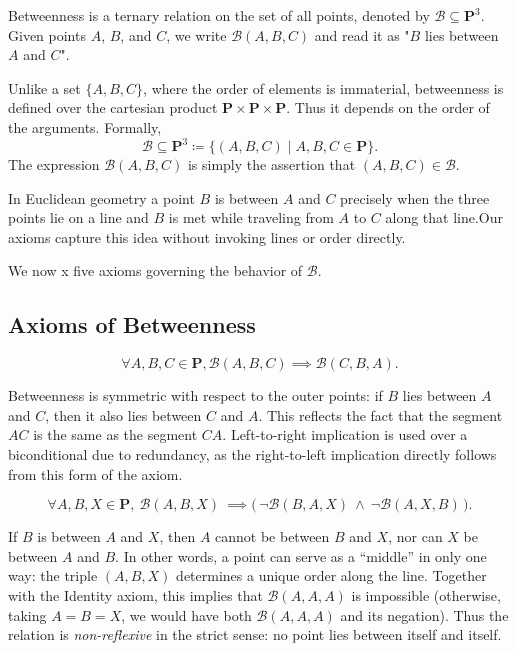 \documentclass[../../../main/main.tex]{subfiles}
\begin{document}
Betweenness is a ternary relation on the set of all points, denoted by $\mathcal{B} \subseteq \mathbf{P}^3$. Given points $A$, $B$, and $C$, we write $\mathcal{B}(A,B,C)$ and read it as "$B$ lies between $A$ and $C$".

Unlike a set $\{A, B, C\}$, where the order of elements is immaterial, betweenness is defined over the cartesian product $\mathbf{P} \times \mathbf{P} \times \mathbf{P}$. Thus it depends on the order of the arguments. Formally,
\[
\mathcal{B} \subseteq \mathbf{P}^3 \coloneqq \{(A, B, C) \mid A, B, C \in \mathbf{P}\}.
\]
The expression $\mathcal{B}(A, B, C)$ is simply the assertion that $(A, B, C) \in \mathcal{B}$.

In Euclidean geometry a point $B$ is between $A$ and $C$ precisely when the three points lie on a line and $B$ is met while traveling from $A$ to $C$ along that line.Our axioms capture this idea without invoking lines or order directly.

We now x five axioms governing the behavior of $\mathcal{B}$.

\subsection{Axioms of Betweenness}

\begin{axiom}\label{ax-symmetry-of-betweenness}
    \[
    \forall A, B, C \in \mathbf{P}, \mathcal{B}(A, B, C) \implies \mathcal{B}(C, B, A).
    \]
\end{axiom}
Betweenness is symmetric with respect to the outer points: if $B$ lies between $A$ and $C$, then it also lies between $C$ and $A$.  This reflects the fact that the segment $AC$ is the same as the segment $CA$. Left-to-right implication is used over a biconditional due to redundancy, as the right-to-left implication directly follows from this form of the axiom.

\begin{axiom}[Order]
\[
\forall A,B,X\in\mathbf{P},\ \mathcal{B}(A,B,X)\ \implies \bigl(\,\neg\mathcal{B}(B,A,X)\ \land\ \neg\mathcal{B}(A,X,B)\,\bigr).
\]
\end{axiom}
If $B$ is between $A$ and $X$, then $A$ cannot be between $B$ and $X$, nor can $X$ be between $A$ and $B$. In other words, a point can serve as a ``middle'' in only one way: the triple $(A,B,X)$ determines a unique order along the line. Together with the Identity axiom, this implies that $\mathcal{B}(A,A,A)$ is impossible (otherwise, taking $A=B=X$, we would have both $\mathcal{B}(A,A,A)$ and its negation). Thus the relation is \emph{non-reflexive} in the strict sense: no point lies between itself and itself.
\end{document}

